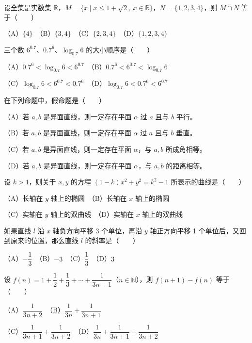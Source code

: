 \begin{question}
设全集是实数集 $\mathbb R$，$M=\{x\mid x\le 1+\sqrt2,\ x\in\mathbb R\}$，$N=\{1,2,3,4\}$，则 $\overline M\cap N$ 等于\mbox{（　　）}

（A）$\{4\}$　（B）$\{3,4\}$　（C）$\{2,3,4\}$　（D）$\{1,2,3,4\}$

\end{question}
\begin{question}
三个数 $6^{0.7}$、$0.7^6$、$\log_{0.7}6$ 的大小顺序是\mbox{（　　）}

（A）$0.7^6<\log_{0.7}6<6^{0.7}$　（B）$0.7^6<6^{0.7}<\log_{0.7}6$

（C）$\log_{0.7}6<6^{0.7}<0.7^6$　（D）$\log_{0.7}6<0.7^6<6^{0.7}$

\end{question}
\begin{question}
在下列命题中，假命题是\mbox{（　　）}

（A）若 $a,b$ 是异面直线，则一定存在平面 $\alpha$ 过 $a$ 且与 $b$ 平行。

（B）若 $a,b$ 是异面直线，则一定存在平面 $\alpha$ 过 $a$ 且与 $b$ 垂直。

（C）若 $a,b$ 是异面直线，则一定存在平面 $\alpha$，与 $a,b$ 所成角相等。

（D）若 $a,b$ 是异面直线，则一定存在平面 $\alpha$，与 $a,b$ 的距离相等。

\end{question}
\begin{question}
设 $k>1$，则关于 $x,y$ 的方程 $(1-k)x^2+y^2=k^2-1$ 所表示的曲线是\mbox{（　　）}

（A）长轴在 $y$ 轴上的椭圆　（B）长轴在 $x$ 轴上的椭圆

（C）实轴在 $y$ 轴上的双曲线　（D）实轴在 $x$ 轴上的双曲线

\end{question}
\begin{question}
如果直线 $l$ 沿 $x$ 轴负方向平移 3 个单位，再沿 $y$ 轴正方向平移 1 个单位后，又回到原来的位置，那么直线 $l$ 的斜率是\mbox{（　　）}

（A）$-\dfrac13$　（B）$-3$　（C）$\dfrac13$　（D）$3$

\end{question}
\begin{question}
设 $f(n)=1+\dfrac12+\dfrac13+\cdots+\dfrac1{3n-1}$（$n\in\mathbb N$），则 $f(n+1)-f(n)$ 等于\mbox{（　　）}

（A）$\dfrac1{3n+2}$　（B）$\dfrac1{3n}+\dfrac1{3n+1}$

（C）$\dfrac1{3n+1}+\dfrac1{3n+2}$　（D）$\dfrac1{3n}+\dfrac1{3n+1}+\dfrac1{3n+2}$

\end{question}

